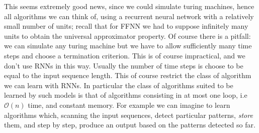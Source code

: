 This seems extremely good news, since we could simulate turing machines, hence all algorithms we can think of, using a recurrent neural network with a relatively small number of units; 
recall that for FFNN we had to suppose infinitely many units to obtain the universal approximator property.
Of course there is a pitfall: we can simulate any turing machine but we have to allow sufficiently many time steps and choose a termination criterion.
This is of course impractical, and we don't use RNNs in this way. Usually the number of time steps is choose to be equal to the input sequence length. This of course restrict the class of algorithm we can learn with RNNs. 
In particular the class of algorithms suited to be learned by such models is that of algorithms consisting in at most one loop, i.e $\mathcal{O}(n)$ time, and constant memory. For example we can imagine to learn algorithms which, scanning the input sequences, detect particular patterns, \textit{store} them, and step by step, produce an output based on the patterns detected so far.





